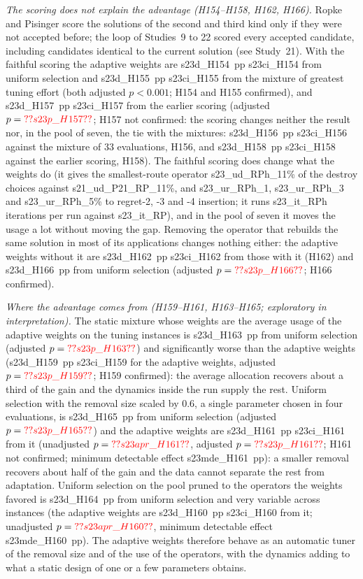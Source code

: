 \emph{The scoring does not explain the advantage (H154--H158, H162, H166).} Ropke and Pisinger score the solutions of the second and third kind only if they were not accepted before; the loop of Studies~9 to 22 scored every accepted candidate, including candidates identical to the current solution (see Study~21). With the faithful scoring the adaptive weights are \num{s23d_H154}~pp \num{s23ci_H154} from uniform selection and \num{s23d_H155}~pp \num{s23ci_H155} from the mixture of greatest tuning effort (both adjusted $p<0.001$; H154 and H155 confirmed), and \num{s23d_H157}~pp \num{s23ci_H157} from the earlier scoring (adjusted $p=\num{s23p_H157}$; H157 not confirmed: the scoring changes neither the result nor, in the pool of seven, the tie with the mixtures: \num{s23d_H156}~pp \num{s23ci_H156} against the mixture of 33 evaluations, H156, and \num{s23d_H158}~pp \num{s23ci_H158} against the earlier scoring, H158). The faithful scoring does change what the weights do (it gives the smallest-route operator \num{s23_ud_RPh_11}\% of the destroy choices against \num{s21_ud_P21_RP_11}\%, and \num{s23_ur_RPh_1}, \num{s23_ur_RPh_3} and \num{s23_ur_RPh_5}\% to regret-2, -3 and -4 insertion; it runs \num{s23_it_RPh} iterations per run against \num{s23_it_RP}), and in the pool of seven it moves the usage a lot without moving the gap. Removing the operator that rebuilds the same solution in most of its applications changes nothing either: the adaptive weights without it are \num{s23d_H162}~pp \num{s23ci_H162} from those with it (H162) and \num{s23d_H166}~pp from uniform selection (adjusted $p=\num{s23p_H166}$; H166 confirmed).

\emph{Where the advantage comes from (H159--H161, H163--H165; exploratory in interpretation).} The static mixture whose weights are the average usage of the adaptive weights on the tuning instances is \num{s23d_H163}~pp from uniform selection (adjusted $p=\num{s23p_H163}$) and significantly worse than the adaptive weights (\num{s23d_H159}~pp \num{s23ci_H159} for the adaptive weights, adjusted $p=\num{s23p_H159}$; H159 confirmed): the average allocation recovers about a third of the gain and the dynamics inside the run supply the rest. Uniform selection with the removal size scaled by 0.6, a single parameter chosen in four evaluations, is \num{s23d_H165}~pp from uniform selection (adjusted $p=\num{s23p_H165}$) and the adaptive weights are \num{s23d_H161}~pp \num{s23ci_H161} from it (unadjusted $p=\num{s23apr_H161}$, adjusted $p=\num{s23p_H161}$; H161 not confirmed; minimum detectable effect \num{s23mde_H161}~pp): a smaller removal recovers about half of the gain and the data cannot separate the rest from adaptation. Uniform selection on the pool pruned to the operators the weights favored is \num{s23d_H164}~pp from uniform selection and very variable across instances (the adaptive weights are \num{s23d_H160}~pp \num{s23ci_H160} from it; unadjusted $p=\num{s23apr_H160}$, minimum detectable effect \num{s23mde_H160}~pp). The adaptive weights therefore behave as an automatic tuner of the removal size and of the use of the operators, with the dynamics adding to what a static design of one or a few parameters obtains.

